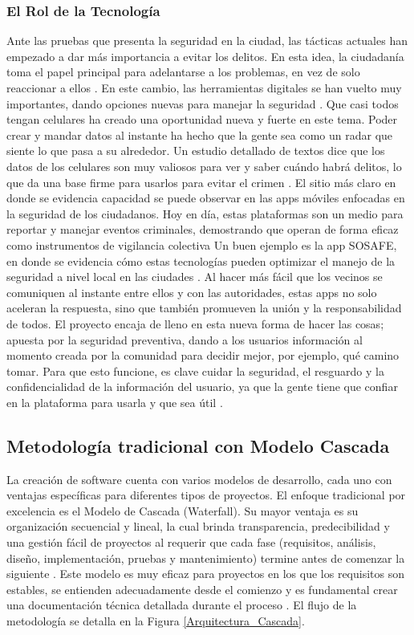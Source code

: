 \subsubsection{El Rol de la Tecnología}
Ante las pruebas que presenta la seguridad en la ciudad, las tácticas actuales han empezado a dar más importancia a evitar los delitos. En esta idea, la ciudadanía toma el papel principal para adelantarse a los problemas, en vez de solo reaccionar a ellos \cite{munizaga2010aspectos}. En este cambio, las herramientas digitales se han vuelto muy importantes, dando opciones nuevas para manejar la seguridad \cite{davila2004puntos}.
Que casi todos tengan celulares ha creado una oportunidad nueva y fuerte en este tema. Poder crear y mandar datos al instante ha hecho que la gente sea como un radar que siente lo que pasa a su alrededor. Un estudio detallado de textos dice que los datos de los celulares son muy valiosos para ver y saber cuándo habrá delitos, lo que da una base firme para usarlos para evitar el crimen \cite{okmi2023systematic}.
El sitio más claro en donde se evidencia capacidad se puede observar en las apps móviles enfocadas en la seguridad de los ciudadanos. Hoy en día, estas plataformas son un medio para reportar y manejar eventos criminales, demostrando que operan de forma eficaz como instrumentos de vigilancia colectiva \cite{espinoza2024aplicacion}
Un buen ejemplo es la app SOSAFE, en donde se evidencia cómo estas tecnologías pueden optimizar el manejo de la seguridad a nivel local en las ciudades \cite{lobos2025efectos}. Al hacer más fácil que los vecinos se comuniquen al instante entre ellos y con las autoridades, estas apps no solo aceleran la respuesta, sino que también promueven la unión y la responsabilidad de todos.
El proyecto encaja de lleno en esta nueva forma de hacer las cosas; apuesta por la seguridad preventiva, dando a los usuarios información al momento creada por la comunidad para decidir mejor, por ejemplo, qué camino tomar. Para que esto funcione, es clave cuidar la seguridad, el resguardo y la confidencialidad de la información del usuario, ya que la gente tiene que confiar en la plataforma para usarla y que sea útil \cite{moya2024seguridad}. 

\subsection{Metodología tradicional con Modelo Cascada}
La creación de software cuenta con varios modelos de desarrollo, cada uno con ventajas específicas para diferentes tipos de proyectos. El enfoque tradicional por excelencia es el Modelo de Cascada (Waterfall). Su mayor ventaja es su organización secuencial y lineal, la cual brinda transparencia, predecibilidad y una gestión fácil de proyectos al requerir que cada fase (requisitos, análisis, diseño, implementación, pruebas y mantenimiento) termine antes de comenzar la siguiente \cite{royce1987managing}. Este modelo es muy eficaz para proyectos en los que los requisitos son estables, se entienden adecuadamente desde el comienzo y es fundamental crear una documentación técnica detallada durante el proceso \cite{moniruzzaman2013comparative}. El flujo de la metodología se detalla en la Figura \ref{Arquitectura_Cascada}.

